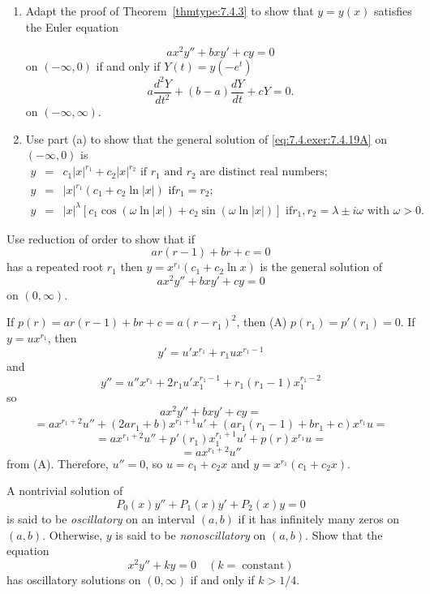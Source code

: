 \documentclass{ximera}
\begin{document}
\begin{problem}\label{exer:7.4.19}
\begin{enumerate}
\item %
Adapt the proof of Theorem~\ref{thmtype:7.4.3} to show that  $y=y(x)$
satisfies the Euler equation

\begin{equation} \label{eq:7.4.exer:7.4.19A}
ax^2y''+bxy'+cy=0
\end{equation}
on $(-\infty,0)$
if and only if  $Y(t)=y(-e^t)$
$$
a \frac{d^2Y}{ dt^2}+(b-a)\frac{dY}{ dt}+cY=0.
$$
on   $(-\infty,\infty)$.
\item %
Use part (a)  to show that  the general solution of
\eqref{eq:7.4.exer:7.4.19A} on $(-\infty,0)$ is
\begin{eqnarray*}
y&=&c_1|x|^{r_1}+c_2|x|^{r_2}\mbox{ if $r_1$ and $r_2$ are distinct
real numbers;  }
\\ y&=&|x|^{r_1}(c_1+c_2\ln|x|)\mbox{ if
$r_1=r_2$;  }
\\ y&=&|x|^{\lambda}\left[c_1\cos\left(\omega\ln|x|\right)+
c_2\sin\left(\omega\ln|x| \right)\right]\mbox{ if
$r_1,r_2=\lambda\pm i\omega$ with $\omega>0$}.
\end{eqnarray*}
\end{enumerate}
\end{problem}

\begin{problem}\label{exer:7.4.20} Use reduction of order to show that if
$$
ar(r-1)+br+c=0
$$
has a repeated root $r_1$ then $y=x^{r_1}(c_1+c_2\ln x)$ is the
general solution of
$$
ax^2y''+bxy'+cy=0
$$
on $(0,\infty)$.

\begin{solution}
    If $p(r)=ar(r-1)+br+c=a(r-r_1)^2$, then (A) $p(r_1)=p'(r_1)=0$.
If $y=ux^{r_1}$, then $$y'=u'x^{r_1}+r_1ux^{r_1-1}$$
and $$y''=u''x^{r_1}+2r_1u'x_1^{r_1-1}+r_1(r_1-1)x_1^{r_1-2}$$ so
$$
ax^2y''+bxy'+cy=$$
$$=ax^{r_1+2}u''+(2ar_1+b)x^{r_1+1}u'
+\left(ar_1(r_1-1)+br_1+c\right)x^{r_1}u=$$
$$=ax^{r_1+2}u''+p'(r_1)x_1^{r_1+1}u'+p(r)x^{r_1}u=$$
$$=ax^{r_1+2}u''$$
from (A). Therefore, $u''=0$, so $u=c_1+c_2x$ and
$y=x^{r_1}(c_1+c_2x)$.
\end{solution}
\end{problem}

\begin{problem}\label{exer:7.4.21}
  A nontrivial solution of
$$
P_0(x)y''+P_1(x)y'+P_2(x)y=0
$$
is said to be \emph{oscillatory} on an interval $(a,b)$ if it has infinitely
many zeros on $(a,b)$.  Otherwise, $y$ is said to be \emph{nonoscillatory}
on $(a,b)$.  Show that the equation
$$
x^2y''+ky=0 \quad (k=\; \mbox{constant})
$$
has oscillatory solutions on $(0,\infty)$ if and only if $k>1/4$.
\end{problem}
\end{document}
